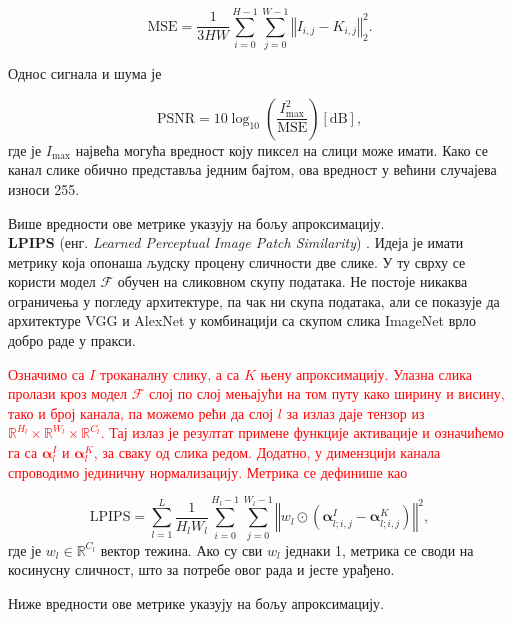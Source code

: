 \documentclass[12pt, a4paper, twoside]{book}
\numberwithin{equation}{chapter}
\numberwithin{theorem}{section}
\numberwithin{definition}{section}
\numberwithin{definitionChapter}{chapter}
\begin{document}
\begin{equation}
	\text{MSE} = \frac{1}{3HW} \sum_{i=0}^{H-1}\sum_{j=0}^{W-1} \left\Vert I_{i, j} - K_{i, j} \right\Vert_2^2.
\end{equation}

Однос сигнала и шума је

\begin{equation}
	\text{PSNR} = 10\log_{10}\left(\frac{I_{\max}^2}{\text{MSE}}\right) \left[\text{dB}\right],
\end{equation}
где је $I_{\max}$ највећа могућа вредност коју пиксел на слици може имати. Како се канал слике обично
представља једним бајтом, ова вредност у већини случајева износи 255.

Више вредности ове метрике указују на бољу апроксимацију. \\

\noindent \textbf{LPIPS} (енг. \textit{Learned Perceptual Image Patch Similarity}) \cite{lpips}. Идеја је имати метрику
која опонаша људску процену сличности две слике. У ту сврху се користи модел $\mathcal{F}$ обучен на сликовном
скупу података. Не постоје никаква ограничења у погледу архитектуре, па чак ни скупа података, али се показује да архитектуре
VGG \cite{vgg} и AlexNet \cite{alexnet} у комбинацији са скупом слика ImageNet врло добро раде у пракси.

\textcolor{red}{
Означимо са $I$ троканалну слику, а са $K$ њену апроксимацију. Улазна слика пролази кроз модел $\mathcal{F}$ слој по слој
мењајући на том путу како ширину и висину, тако и број канала, па можемо рећи да слој $l$ за излаз даје тензор из
$\mathbb{R}^{H_l}\times\mathbb{R}^{W_l}\times\mathbb{R}^{C_l}$. Тај излаз је резултат примене функције активације
и означићемо га са $\boldsymbol{\alpha}_{l}^{I}$ и $\boldsymbol{\alpha}_{l}^{K}$, за сваку од слика редом. Додатно,
у димензцији канала спроводимо јединичну нормализацију. Метрика се дефинише као}

\begin{equation}
	\text{LPIPS} = \sum_{l=1}^{L}\frac{1}{H_l W_l}\sum_{i=0}^{H_l - 1}\sum_{j=0}^{W_l - 1}
	\left\Vert w_l \odot (\boldsymbol{\alpha}_{l; i, j}^{I} - \boldsymbol{\alpha}_{l; i, j}^{K}) \right\Vert^2,
\end{equation}
где је $w_l \in \mathbb{R}^{C_l}$ вектор тежина. Ако су сви $w_l$ једнаки 1, метрика се своди на косинусну сличност,
што за потребе овог рада и јесте урађено.

Ниже вредности ове метрике указују на бољу апроксимацију. \\
\end{document}
